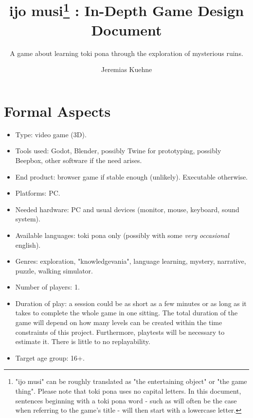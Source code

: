 \documentclass{scrartcl}
\title{ijo musi\footnote{"ijo musi" can be roughly translated as "the entertaining object" or "the game thing". Please note that toki pona uses no capital letters. In this document, sentences beginning with a toki pona word - such as will often be the case when referring to the game's title - will then start with a lowercase letter.} : In-Depth Game Design Document}
\subtitle{A game about learning toki pona through the exploration of mysterious ruins.}
\author{Jeremias Kuehne}
\begin{document}
	
	\maketitle
	\clearpage
	
	\tableofcontents
	\clearpage
	
	\section{Formal Aspects}
		\begin{itemize}
			\item Type: video game (3D).
			\item Tools used: Godot, Blender, possibly Twine for prototyping, possibly Beepbox, other software if the need arises.
			\item End product: browser game if stable enough (unlikely). Executable otherwise.
			\item Platforms: PC.
			\item Needed hardware: PC and usual devices (monitor, mouse, keyboard, sound system).
			\item Available languages: toki pona only (possibly with some \textit{very occasional} english).
			\item Genres: exploration, "knowledgevania", language learning, mystery, narrative, puzzle, walking simulator.
			\item Number of players: 1.
			\item Duration of play: a session could be as short as a few minutes or as long as it takes to complete the whole game in one sitting. The total duration of the game will depend on how many levels can be created within the time constraints of this project. Furthermore, playtests will be necessary to estimate it. There is little to no replayability.
			\item Target age group: 16+.
		\end{itemize}
\end{document}
